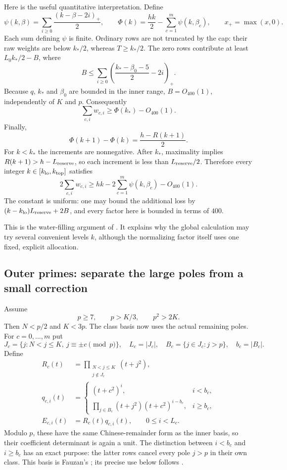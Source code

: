 Here is the useful quantitative interpretation. Define
\[
 \psi(k,\beta)=\sum_{i\ge0}\frac{(k-\beta-2i)_+}{2},
 \qquad
 \Phi(k)=\frac{hk}{2}-\sum_{c=1}^m\psi(k,\beta_c),
 \qquad x_+=\max(x,0).
\]
Each sum defining $\psi$ is finite. Ordinary rows are not truncated
by the cap: their raw weights are below $k_*/2$, whereas $T\ge k_*/2$.
The zero rows contribute at least $L_0k_*/2-B$, where
\[
 B\le \sum_{i\ge0}
 \left(\frac{k_*-\beta_0-5}{2}-2i\right)_+.
\]
Because $q$, $k_*$ and $\beta_0$ are bounded in the inner range,
$B=O_{400}(1)$, independently of $K$ and $p$. Consequently
\[
 \sum_{c,i}w_{c,i}\ge\Phi(k_*)-O_{400}(1).
\]
Finally,
\[
 \Phi(k+1)-\Phi(k)=\frac{h-R(k+1)}2.
\]
For $k<k_*$ the increments are nonnegative. After $k_*$,
maximality implies $R(k+1)>h-L_{\rm reserve}$, so each increment
is less than $L_{\rm reserve}/2$. Therefore every integer
$k\in[k_{\rm lo},k_{\rm top}]$ satisfies
\begin{equation}\label{arith:inner-comparison}
 2\sum_{c,i}w_{c,i}
 \ge hk-2\sum_{c=1}^m\psi(k,\beta_c)-O_{400}(1).
\end{equation}
The constant is uniform: one may bound the additional loss by
$(k-k_{\rm lo})L_{\rm reserve}+2B$, and every factor here is
bounded in terms of $400$.

This is the water-filling argument of
\cite[\texttt{InnerAlloc.lean}, \texttt{PhiK\_le\_kf}]{firsching}.
It explains why the global calculation may try several convenient
levels $k$, although the normalizing factor itself uses one fixed,
explicit allocation.

\subsection{Outer primes: separate the large poles from a small correction}

Assume
\[
 p\ge7,\qquad p>K/3,\qquad p^2>2K.
\]
Then $N<p/2$ and $K<3p$. The class basis now uses the actual remaining
poles. For $c=0,\ldots,m$ put
\[
 J_c=\{j:N<j\le K,\ j\equiv\pm c\pmod p\},\quad
 L_c=|J_c|,\quad
 B_c=\{j\in J_c:j>p\},\quad b_c=|B_c|.
\]
Define
\begin{align*}
 R_c(t)&=\prod_{\substack{N<j\le K\\j\notin J_c}}(t+j^2),\\
 q_{c,i}(t)&=
 \begin{cases}
 (t+c^2)^i,&i<b_c,\\
 \displaystyle\prod_{j\in B_c}(t+j^2)(t+c^2)^{i-b_c},&i\ge b_c,
 \end{cases}\\
 E_{c,i}(t)&=R_c(t)q_{c,i}(t),\qquad 0\le i<L_c.
\end{align*}
Modulo $p$, these have the same Chinese-remainder form as the inner
basis, so their coefficient determinant is again a unit.
The distinction between $i<b_c$ and $i\ge b_c$ has an exact purpose:
the latter rows cancel every pole $j>p$ in their own class.
This basis is Fauzan's \cite[\S4.2]{fauzan}; its precise use below follows
\cite[\texttt{OuterBasis.lean}, \texttt{OuterEntryMain.lean}]{firsching}.

